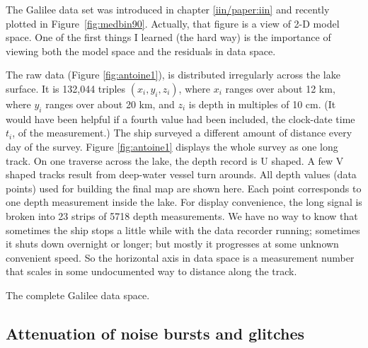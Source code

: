 \par
The Galilee data set was introduced in chapter \ref{iin/paper:iin}
and recently plotted in Figure~\ref{fig:medbin90}.
Actually, that figure is a view of 2-D model space.
One of the first things I learned (the hard way) is the importance
of viewing both the model space and the residuals in data space.
\par
{}

\par
The raw data (Figure \ref{fig:antoine1}),
is distributed irregularly across the lake surface.
It is 132,044 triples $(x_i,y_i,z_i)$, where $x_i$ ranges over about 
12 km, where $y_i$ ranges over about 20 km,
and $z_i$ is depth in multiples of 10 cm.
(It would have been helpful if a fourth value had been included,
the clock-date time $t_i$, of the measurement.)
The ship surveyed a different amount of distance every day of the survey.
Figure \ref{fig:antoine1} displays the whole survey as one long track.
On one traverse across the lake, the depth record is U shaped.
A few V shaped tracks result from deep-water vessel turn arounds.
All depth values (data points) used for building the final map are shown here.
Each point corresponds to one depth measurement inside the lake.
For display convenience, the long signal is broken
into 23 strips of 5718 depth measurements.
We have no way to know that sometimes the ship stops a little while
with the data recorder running;
sometimes it shuts down overnight or longer;
but mostly it progresses at some unknown convenient speed.
So the horizontal axis in data space is a measurement number
that scales in some undocumented way to distance along the track.

 {
  The complete Galilee data space.}


\subsection{Attenuation of noise bursts and glitches}


